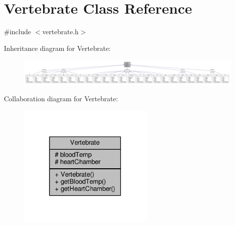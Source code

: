 \hypertarget{classVertebrate}{}\section{Vertebrate Class Reference}
\label{classVertebrate}


{\ttfamily \#include $<$vertebrate.\+h$>$}



Inheritance diagram for Vertebrate\+:
\nopagebreak
\begin{figure}[H]
\begin{center}
\leavevmode
\includegraphics[width=350pt]{classVertebrate__inherit__graph}
\end{center}
\end{figure}


Collaboration diagram for Vertebrate\+:
\nopagebreak
\begin{figure}[H]
\begin{center}
\leavevmode
\includegraphics[width=189pt]{classVertebrate__coll__graph}
\end{center}
\end{figure}

